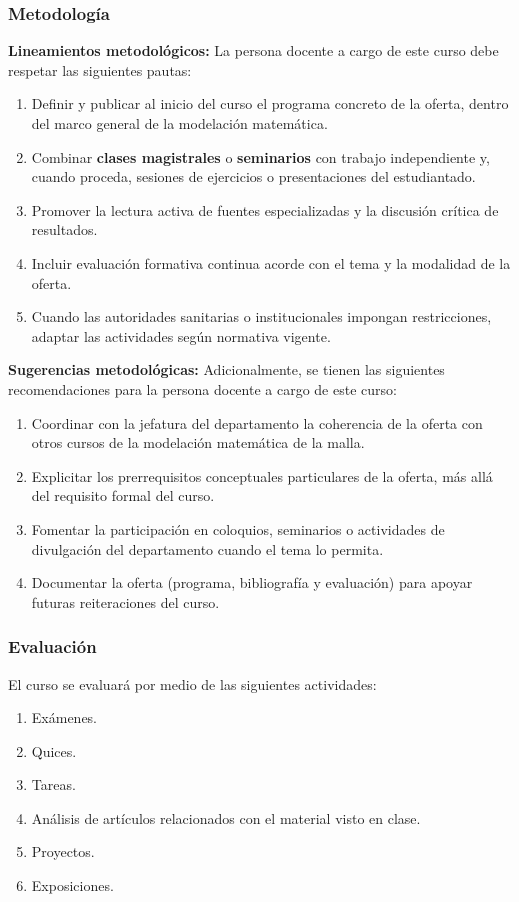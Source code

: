 \begin{refsection}
\subsubsection*{Metodología}

\noindent \textbf{Lineamientos metodológicos:} La persona docente a cargo de este curso debe respetar las siguientes pautas:

\begin{enumerate}
    \item Definir y publicar al inicio del curso el programa concreto de la oferta, dentro del marco general de la modelación matemática.
    \item Combinar \textbf{clases magistrales} o \textbf{seminarios} con trabajo independiente y, cuando proceda, sesiones de ejercicios o presentaciones del estudiantado.
    \item Promover la lectura activa de fuentes especializadas y la discusión crítica de resultados.
    \item Incluir evaluación formativa continua acorde con el tema y la modalidad de la oferta.
    \item Cuando las autoridades sanitarias o institucionales impongan restricciones, adaptar las actividades según normativa vigente.
\end{enumerate}

\textbf{Sugerencias metodológicas:} Adicionalmente, se tienen las siguientes recomendaciones para la persona docente a cargo de este curso:

\begin{enumerate}
    \item Coordinar con la jefatura del departamento la coherencia de la oferta con otros cursos de la modelación matemática de la malla.
    \item Explicitar los prerrequisitos conceptuales particulares de la oferta, más allá del requisito formal del curso.
    \item Fomentar la participación en coloquios, seminarios o actividades de divulgación del departamento cuando el tema lo permita.
    \item Documentar la oferta (programa, bibliografía y evaluación) para apoyar futuras reiteraciones del curso.
\end{enumerate}

\subsubsection*{Evaluación}

El curso se evaluará por medio de las siguientes actividades:

\begin{enumerate}
\item Exámenes.
\item Quices.
\item Tareas.
\item Análisis de artículos relacionados con el material visto en clase.
\item Proyectos.
\item Exposiciones.
\end{enumerate}

\end{refsection}
